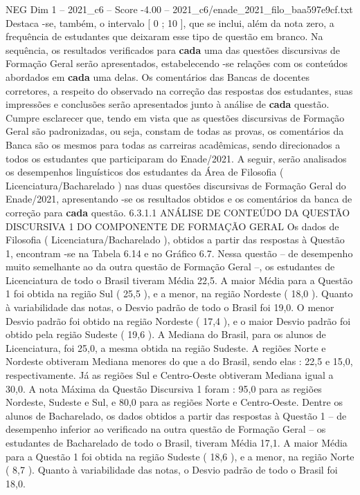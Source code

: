 \begin{textsample}{NEG Dim 1 – 2021\_c6 – Score -4.00 – 2021\_c6/enade\_2021\_filo\_baa597e9cf.txt}
Destaca -se, também, o intervalo [ 0 ; 10 ], que se inclui, além da nota zero, a frequência de estudantes que deixaram esse tipo de questão em branco.
Na sequência, os resultados verificados para \textbf{cada} uma das questões discursivas de Formação Geral serão apresentados, estabelecendo -se relações com os conteúdos abordados em \textbf{cada} uma delas.
Os comentários das Bancas de docentes corretores, a respeito do observado na correção das respostas dos estudantes, suas impressões e conclusões serão apresentados junto à análise de \textbf{cada} questão.
Cumpre esclarecer que, tendo em vista que as questões discursivas de Formação Geral são padronizadas, ou seja, constam de todas as provas, os comentários da Banca são os mesmos para todas as carreiras acadêmicas, sendo direcionados a todos os estudantes que participaram do Enade/2021.
A seguir, serão analisados os desempenhos linguísticos dos estudantes da Área de Filosofia ( Licenciatura/Bacharelado ) nas duas questões discursivas de Formação Geral do Enade/2021, apresentando -se os resultados obtidos e os comentários da banca de correção para \textbf{cada} questão. 6.3.1.1 ANÁLISE DE CONTEÚDO DA QUESTÃO DISCURSIVA 1 DO COMPONENTE DE FORMAÇÃO GERAL Os dados de Filosofia ( Licenciatura/Bacharelado ), obtidos a partir das respostas à Questão 1, encontram -se na Tabela 6.14 e no Gráfico 6.7.
Nessa questão – de desempenho muito semelhante ao da outra questão de Formação Geral –, os estudantes de Licenciatura de todo o Brasil tiveram Média 22,5.
A maior Média para a Questão 1 foi obtida na região Sul ( 25,5 ), e a menor, na região Nordeste ( 18,0 ).
Quanto à variabilidade das notas, o Desvio padrão de todo o Brasil foi 19,0.
O menor Desvio padrão foi obtido na região Nordeste ( 17,4 ), e o maior Desvio padrão foi obtido pela região Sudeste ( 19,6 ).
A Mediana do Brasil, para os alunos de Licenciatura, foi 25,0, a mesma obtida na região Sudeste.
A regiões Norte e Nordeste obtiveram Mediana menores do que a do Brasil, sendo elas : 22,5 e 15,0, respectivamente.
Já as regiões Sul e Centro-Oeste obtiveram Mediana igual a 30,0.
A nota Máxima da Questão Discursiva 1 foram : 95,0 para as regiões Nordeste, Sudeste e Sul, e 80,0 para as regiões Norte e Centro-Oeste.
Dentre os alunos de Bacharelado, os dados obtidos a partir das respostas à Questão 1 – de desempenho inferior ao verificado na outra questão de Formação Geral – os estudantes de Bacharelado de todo o Brasil, tiveram Média 17,1.
A maior Média para a Questão 1 foi obtida na região Sudeste ( 18,6 ), e a menor, na região Norte ( 8,7 ).
Quanto à variabilidade das notas, o Desvio padrão de todo o Brasil foi 18,0.

\end{textsample}
